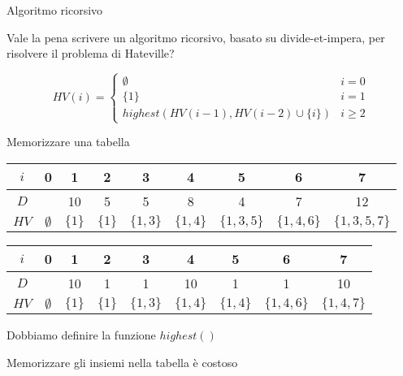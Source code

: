\begin{frame}{Algoritmo ricorsivo}

\vspace{-9pt}
\begin{myboxtitle}[Domanda]
Vale la pena scrivere un algoritmo ricorsivo, basato su divide-et-impera,
per risolvere il problema di Hateville?
\end{myboxtitle}

\bigskip
\begin{overprint}
\[
HV(i) = \begin{cases}
  \emptyset & i=0 \\
  \{ 1 \} & i=1 \\
  \mathit{highest}(HV(i-1), HV(i-2) \cup \{ i \}) & i \geq 2
  \end{cases}
\]
\end{overprint}

\end{frame}

\begin{frame}{Memorizzare una tabella}

\vspace{-9pt}
\begin{myboxtitle}[Esempi]
\small
\medskip
\begin{tabular}{|c|c|c|c|c|c|c|c|c|}
\hline
$i$ & 0 & 1 & 2 & 3 & 4 & 5 & 6 & 7 \\\hline
$D$ &   & 10 & 5 & 5 & 8 & 4 & 7 & 12 \\\hline
$HV$ & $\emptyset$ & $\{ 1 \}$ & $\{ 1 \}$ & $\{ 1,3 \}$ & $\{ 1,4 \}$ & $\{ 1,3,5 \}$ & $ \{ 1,4,6 \}$ & $\{ 1,3,5,7 \}$ \\\hline
\end{tabular}

\medskip
\begin{tabular}{|c|c|c|c|c|c|c|c|c|}
\hline
$i$ & 0 & 1 & 2 & 3 & 4 & 5 & 6 & 7 \\\hline
$D$ &   & 10 & 1 & 1 & 10 & 1 & 1 & 10 \\\hline
$HV$ & $\emptyset$ & $\{ 1 \}$ & $\{ 1 \}$ & $\{ 1,3 \}$ & $\{ 1,4 \}$ & $\{ 1, 4 \}$ & $ \{ 1,4,6 \}$ & $\{ 1,4,7 \}$ \\\hline
\end{tabular}
\end{myboxtitle}

\begin{myboxtitle}[Problemi]
\BIL
\item Dobbiamo definire la funzione $\mathit{highest}()$
\item \alert{Memorizzare gli insiemi nella tabella è costoso}
\EIL
\end{myboxtitle}

\end{frame}

